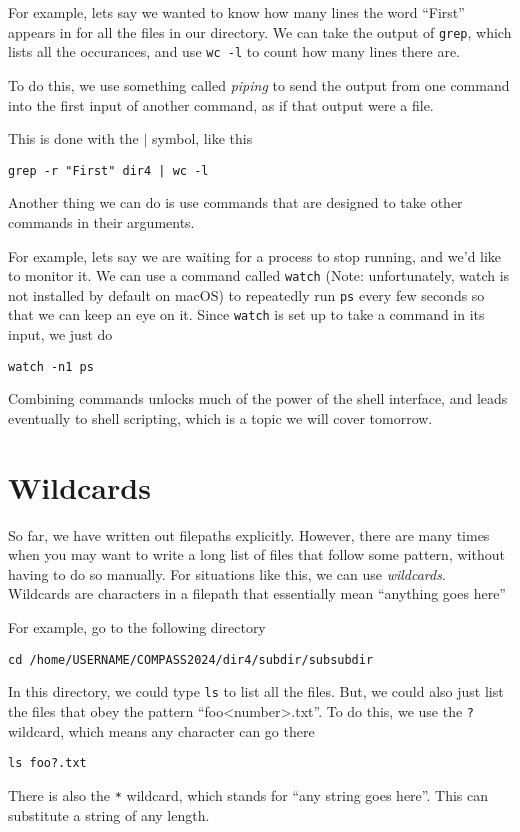 \documentclass[aps,showpacs,prd,notitlepage,preprintnumbers,amsmath,amssymb,letterpaper]{revtex4}
\begin{document}
For example, lets say we wanted to know how many lines the word ``First'' appears in for all the files in our directory.
We can take the output of \verb|grep|, which lists all the occurances, and use \verb|wc -l| to count how many lines there are.

To do this, we use something called \textit{piping} to send the output from one command into the first input of another command, as if that output were a file.

This is done with the $|$ symbol, like this
\begin{verbatim}
grep -r "First" dir4 | wc -l
\end{verbatim}

Another thing we can do is use commands that are designed to take other commands in their arguments.

For example, lets say we are waiting for a process to stop running, and we'd like to monitor it.
We can use a command called \verb|watch| (Note: unfortunately, watch is not installed by default on macOS) to repeatedly run \verb|ps| every few seconds so that we can keep an eye on it.
Since \verb|watch| is set up to take a command in its input, we just do
\begin{verbatim}
watch -n1 ps
\end{verbatim}

Combining commands unlocks much of the power of the shell interface, and leads eventually to shell scripting, which is a topic we will cover tomorrow.

\section{Wildcards}
So far, we have written out filepaths explicitly. However, there are many times when you may want to write a long list of files that follow some pattern, without having to do so manually.
For situations like this, we can use \textit{wildcards}. Wildcards are characters in a filepath that essentially mean ``anything goes here''

For example, go to the following directory
\begin{verbatim}
cd /home/USERNAME/COMPASS2024/dir4/subdir/subsubdir
\end{verbatim}
In this directory, we could type \verb|ls| to list all the files.
But, we could also just list the files that obey the pattern ``foo<number>.txt''.
To do this, we use the \verb|?| wildcard, which means any character can go there

\begin{verbatim}
ls foo?.txt
\end{verbatim}
There is also the \verb|*| wildcard, which stands for ``any string goes here''.
This can substitute a string of any length.
\end{document}
